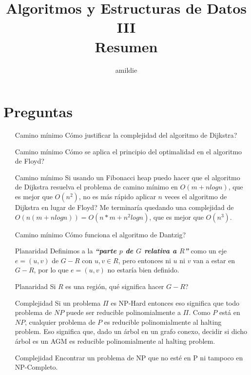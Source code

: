 \documentclass[10pt, a4paper]{article}
\title{Algoritmos y Estructuras de Datos III\\Resumen}
\author{amildie}
\date{\vspace{-5ex}}
\begin{document}
\renewcommand*\contentsname{\empty}

\maketitle
\tableofcontents

%













\newpage
\section{Preguntas}
\begin{enumerate}
\item [Camino m\'inimo] C\'omo justificar la complejidad del algoritmo de Dijkstra?
\item [Camino m\'inimo] C\'omo se aplica el principio del optimalidad en el algoritmo de Floyd?
\item [Camino m\'inimo] Si usando un Fibonacci heap puedo hacer que el algoritmo de Dijkstra resuelva el problema de camino m\'inimo en $O(m + n log n)$, que es mejor que $O(n^2)$, no es m\'as r\'apido aplicar $n$ veces el algoritmo de Dijkstra en lugar de Floyd? Me terminar\'ia quedando una complejidad de $O(n(m + n log n)) = $$O(n*m + n^2 log n)$, que es mejor que $O(n^3)$.
\item [Camino m\'inimo] C\'omo funciona el algoritmo de Dantzig?
\item [Planaridad] Definimos a la \textbf{\emph{``parte $p$ de $G$ relativa a $R$''}} como un eje $e = (u, v)$ de $G - R$ con $u,v \in R$, pero entonces ni $u$ ni $v$ van a estar en $G - R$, por lo que $e = (u, v)$ no estar\'ia bien definido.
\item [Planaridad] Si $R$ es una regi\'on, qu\'e significa hacer $G - R$?
\item [Complejidad] Si un problema $\Pi$ es NP-Hard entonces eso significa que todo problema de $NP$ puede ser reducible polinomialmente a $\Pi$. Como $P$ est\'a en $NP$, cualquier problema de $P$ es reducible polinomialmente al halting problem. Eso significa que, dado un \'arbol en un grafo conexo, decidir si dicho \'arbol es un AGM es reducible polinomialmente al halting problem.
\item [Complejidad] Encontrar un problema de NP que no est\'e en P ni tampoco en NP-Completo.
\end{enumerate}
\end{document}
